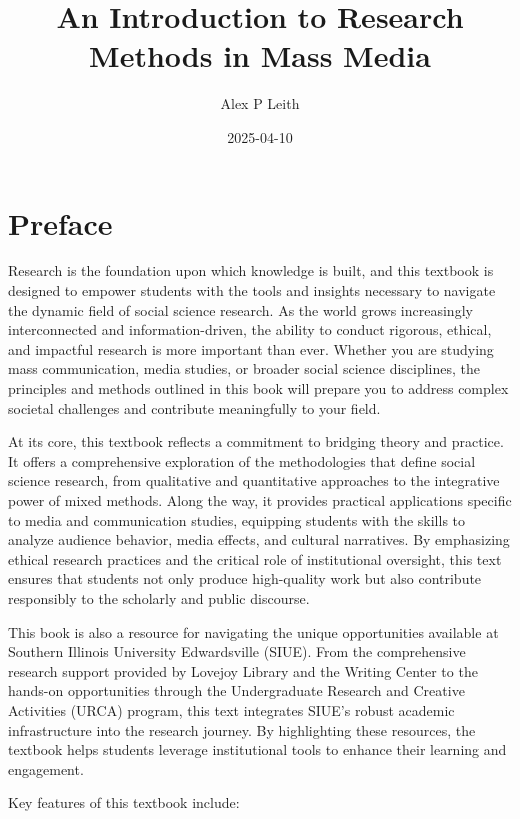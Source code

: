 \documentclass[
]{book}
\title{An Introduction to Research Methods in Mass Media}
\author{Alex P Leith}
\date{2025-04-10}
\begin{document}
\maketitle

{
\setcounter{tocdepth}{1}
\tableofcontents
}
\chapter*{Preface}\label{preface}

Research is the foundation upon which knowledge is built, and this textbook is designed to empower students with the tools and insights necessary to navigate the dynamic field of social science research. As the world grows increasingly interconnected and information-driven, the ability to conduct rigorous, ethical, and impactful research is more important than ever. Whether you are studying mass communication, media studies, or broader social science disciplines, the principles and methods outlined in this book will prepare you to address complex societal challenges and contribute meaningfully to your field.

At its core, this textbook reflects a commitment to bridging theory and practice. It offers a comprehensive exploration of the methodologies that define social science research, from qualitative and quantitative approaches to the integrative power of mixed methods. Along the way, it provides practical applications specific to media and communication studies, equipping students with the skills to analyze audience behavior, media effects, and cultural narratives. By emphasizing ethical research practices and the critical role of institutional oversight, this text ensures that students not only produce high-quality work but also contribute responsibly to the scholarly and public discourse.

This book is also a resource for navigating the unique opportunities available at Southern Illinois University Edwardsville (SIUE). From the comprehensive research support provided by Lovejoy Library and the Writing Center to the hands-on opportunities through the Undergraduate Research and Creative Activities (URCA) program, this text integrates SIUE's robust academic infrastructure into the research journey. By highlighting these resources, the textbook helps students leverage institutional tools to enhance their learning and engagement.

Key features of this textbook include:
\end{document}

